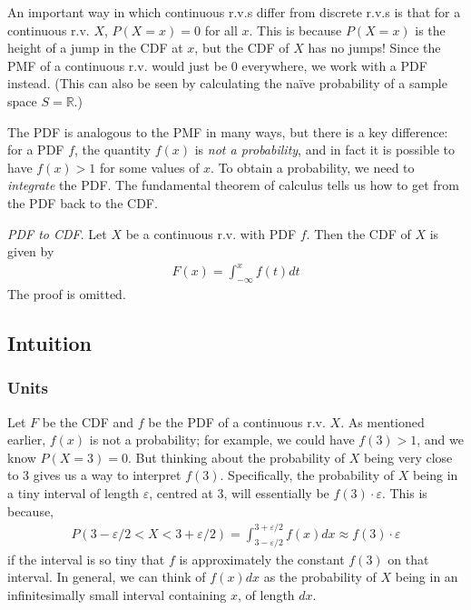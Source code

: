 An important way in which continuous r.v.s differ from discrete r.v.s 
is that for a continuous r.v. \(X\), 
\(P(X = x) = 0\) for all \(x\). 
This is because \(P(X = x)\) is the height of a jump in the CDF at \(x\), 
but the CDF of \(X\) has no jumps! 
Since the PMF of a continuous r.v. would just be 0 everywhere, 
we work with a PDF instead. 
(This can also be seen by calculating the naïve probability of a sample space \(S=\mathbb{R}\).)

The PDF is analogous to the PMF in many ways, 
but there is a key difference: for a PDF \(f\), 
the quantity \(f(x)\) is \emph{not a probability}, 
and in fact it is possible to have \(f(x) > 1\) for some values of \(x\). 
To obtain a probability, 
we need to \emph{integrate} the PDF. 
The fundamental theorem of calculus tells us how to get from the PDF back to the CDF.

\emph{PDF to CDF}. 
Let \(X\) be a continuous r.v. with PDF \(f\). 
Then the CDF of \(X\) is given by
\begin{align}
F(x) = \int_{- \infty}^{x}{f(t)}dt
\end{align}
The proof is omitted.

\subsection{Intuition}

\subsubsection{Units}

Let \(F\) be the CDF and \(f\) be the PDF of a continuous r.v. \(X\). 
As mentioned earlier, 
\(f(x)\) is not a probability; 
for example, we could have \(f(3) > 1\), and we know \(P(X = 3) = 0\). 
But thinking about the probability of \(X\) being very close to 3 gives us a way to interpret \(f(3)\). 
Specifically, the probability of \(X\) being in a tiny interval of length \(\varepsilon\),
centred at 3, will essentially be \(f(3) \cdot \varepsilon\). 
This is because,
\begin{align}
P(3 - \varepsilon/2 < X < 3 + \varepsilon/2) = 
\int_{3 - \varepsilon/2}^{3 + \varepsilon/2}{f(x)}dx \approx f(3) \cdot \varepsilon
\end{align}
if the interval is so tiny that \(f\) is approximately the constant \(f(3)\) on that interval. 
In general, 
we can think of \(f(x)dx\) as the probability of \(X\) being in 
an infinitesimally small interval containing \(x\), of length \(dx\).

